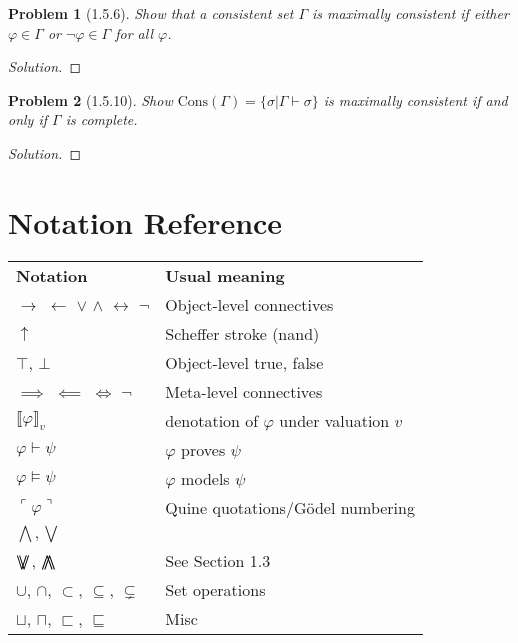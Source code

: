 \documentclass[letter]{article}
\newtheorem{problem}{Problem}
\theoremstyle{definition}
\newenvironment{solution}
{\begin{proof}[Solution]}
	{\end{proof}}
\renewcommand{\phi}{\varphi}
\DeclareMathOperator*{\bigdoublewedge}{\bigwedge\mkern-15mu\bigwedge}
\DeclareMathOperator*{\bigdoublevee}{\bigvee\mkern-15mu\bigvee}
\begin{document}
\begin{problem}[1.5.6] Show that a consistent set $\Gamma$ is maximally consistent if either $\phi \in \Gamma$ or $\neg \phi \in \Gamma$ for all $\phi$.
\end{problem}
\begin{solution}
\end{solution}


\begin{problem}[1.5.10] Show $\textrm{Cons}(\Gamma) = \{ \sigma | \Gamma \vdash \sigma \}$ is maximally consistent if and only if $\Gamma$ is complete.
\end{problem}
\begin{solution}
\end{solution}


\section{Notation Reference}

\begin{table}[H]
    \begin{tabular}{ll}
        \textbf{Notation} & \textbf{Usual meaning} \\
        $\to$ $\leftarrow$ $\lor$ $\land$ $\leftrightarrow$ $\neg$ & Object-level connectives \\
        $\uparrow$ & Scheffer stroke (nand)\\
        $\top$, $\bot$ & Object-level true, false \\
        $\implies$ $\impliedby$ $\iff$ $\neg$ & Meta-level connectives \\

        $\llbracket \phi \rrbracket_v$ & denotation of $\phi$ under valuation $v$\\
        $\phi \vdash \psi$ & $\phi$ proves $\psi$ \\
        $\phi \models \psi$ & $\phi$ models $\psi$ \\
        $\ulcorner \phi \urcorner$ & Quine quotations/G\"odel numbering \\
        $\bigwedge, \bigvee$ & \\
        $\bigdoublevee$, $\bigdoublewedge$ & See Section 1.3 \\
        $\cup$, $\cap$, $\subset$, $\subseteq$, $\subsetneq$ & Set operations \\
        $\sqcup$, $\sqcap$, $\sqsubset$, $\sqsubseteq$ & Misc \\
\end{tabular}
\end{table}
\end{document}
